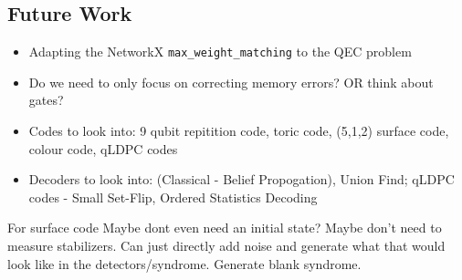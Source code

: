 \documentclass[a4paper,12pt]{article}
\begin{document}
\subsection{Future Work}
\begin{itemize}
    \item Adapting the NetworkX \verb|max_weight_matching| to the QEC problem
    \item Do we need to only focus on correcting memory errors? OR think about gates?
    \item Codes to look into: 9 qubit repitition code, toric code, (5,1,2) surface code, colour code, qLDPC codes
    \item Decoders to look into: (Classical - Belief Propogation), Union Find; qLDPC codes -  Small Set-Flip, Ordered Statistics Decoding
\end{itemize}

For surface code
Maybe dont even need an initial state? Maybe don't need to measure stabilizers.
Can just directly add noise and generate what that would look like in the detectors/syndrome.
Generate blank syndrome.
\end{document}

